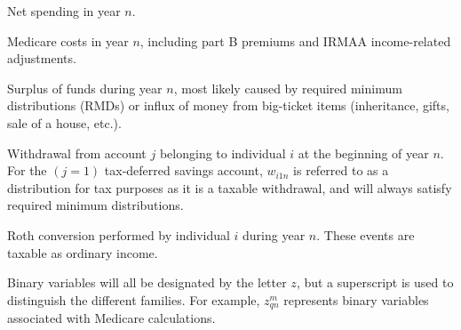 \documentclass{report}[fleqn,11pt]
\begin{document}
\begin{description}[leftmargin=4em,style=multiline]
\item [$g_n$]
	Net spending in year $n$.
\item [$m_n$]
	Medicare costs in year $n$, including part B premiums and IRMAA income-related adjustments.
\item [$s_{n}$]
	Surplus of funds during year $n$, most likely caused by required minimum distributions (RMDs)
	or influx of money from big-ticket items (inheritance, gifts, sale of a house, etc.).
\item [$w_{ijn}$]
	Withdrawal from account $j$ belonging to individual $i$ at the beginning of year $n$.
	For the $(j=1)$ tax-deferred savings account, $w_{i1n}$ is referred to as a distribution for
	tax purposes as it is a taxable withdrawal, and will always satisfy required minimum distributions.
\item [$x_{in}$]
	Roth conversion performed by individual $i$ during year $n$.
	These events are taxable as ordinary income.
\item [$z_{*}^*$]
	Binary variables will all be designated by the letter $z$, but a superscript is
	used to distinguish the different families. For example, $z_{qn}^m$ represents
	binary variables associated with Medicare calculations.
\end{description}
\end{document}
